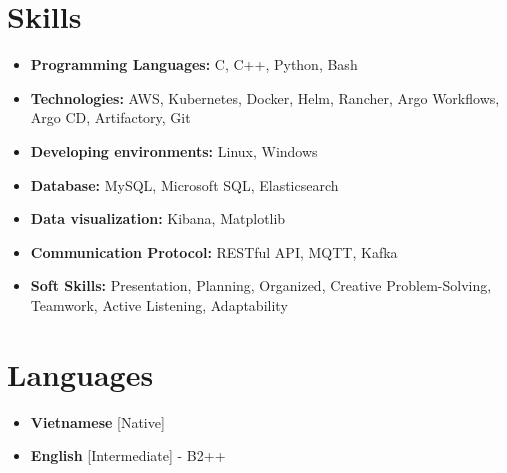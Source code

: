 \documentclass[11pt,a4paper,sans]{moderncv}
\begin{document}
\iffalse %
\section{Online Courses \& Certifications}
{\begin{itemize}[label=\textbullet]
      \item Introduction to Digital Marketing (Jan. 2023) - \underline{\color{blue}\href{https://google.com/}{SEMRUSH}}
      \item Career Essentials in Digital Marketing by LinkedIn (Aug. 2022) - \underline{\color{blue}\href{https://google.com/}{LinkedIn}}
      \item Visualization with Tableau (Feb. 2022) - \underline{\color{blue}\href{https://google.com/}{Coursera}}
      \item Foundations of Google Analytics  (Jun. 2021) - \underline{\color{blue}\href{https://google.com/}{Google, Coursera}}
     \item Google Analytics for Power Users (Jun. 2021) - \underline{\color{blue}\href{https://google.com/}{Google}}
       \item The Fundamentals of Digital Marketing, (Jul. 2019) - \underline{\color{blue}\href{https://google.com/}{Google}} 
  \end{itemize}}
\fi

\section{Skills}
{\begin{itemize}[label=\textbullet]
\item {\textbf{Programming Languages:} C, C++, Python, Bash}
\item {\textbf{Technologies:} AWS, Kubernetes, Docker, Helm, Rancher, Argo Workflows, Argo CD, Artifactory, Git}
\item {\textbf{Developing environments:} Linux, Windows}
\item {\textbf{Database:} MySQL, Microsoft SQL, Elasticsearch}
\item {\textbf{Data visualization:} Kibana, Matplotlib}
\item {\textbf{Communication Protocol:} RESTful API, MQTT, Kafka}
\item {\textbf{Soft Skills:} Presentation, Planning, Organized, Creative Problem-Solving, Teamwork, Active Listening, Adaptability}
\end{itemize}}

\section{Languages}
\begin{multicols}{2}
    \begin{itemize}[label=\textbullet]
    \item \textbf{Vietnamese} [Native]
    \item {\textbf{English} [Intermediate] - B2++}
    \end{itemize}
\end{multicols}

\end{document}
